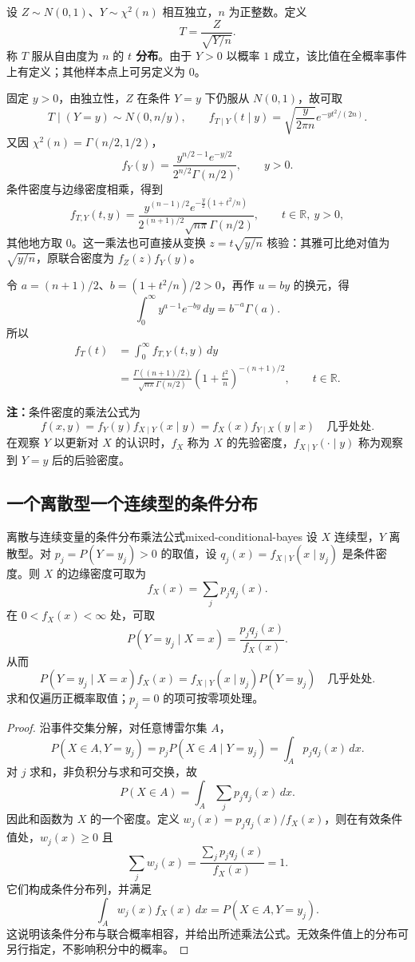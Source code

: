\begin{example}[$t$ 分布的密度]
设 $Z\sim N(0,1)$、$Y\sim\chi^2(n)$ 相互独立，$n$ 为正整数。定义
\[
T=\frac{Z}{\sqrt{Y/n}}.
\]
称 $T$ 服从自由度为 $n$ 的 \textbf{$t$ 分布}。由于 $Y>0$ 以概率 $1$ 成立，该比值在全概率事件上有定义；其他样本点上可另定义为 $0$。

固定 $y>0$，由独立性，$Z$ 在条件 $Y=y$ 下仍服从 $N(0,1)$，故可取
\[
T\mid(Y=y)\sim N(0,n/y),\qquad
f_{T\mid Y}(t\mid y)=\sqrt{\frac{y}{2\pi n}}e^{-yt^2/(2n)}.
\]
又因 $\chi^2(n)=\Gamma(n/2,1/2)$，
\[
f_Y(y)=\frac{y^{n/2-1}e^{-y/2}}{2^{n/2}\Gamma(n/2)},\qquad y>0.
\]
条件密度与边缘密度相乘，得到
\[
f_{T,Y}(t,y)=
\frac{y^{(n-1)/2}e^{-\frac y2(1+t^2/n)}}
 {2^{(n+1)/2}\sqrt{n\pi}\Gamma(n/2)},
\qquad t\in\mathbb R,\ y>0,
\]
其他地方取 $0$。这一乘法也可直接从变换 $z=t\sqrt{y/n}$ 核验：其雅可比绝对值为 $\sqrt{y/n}$，原联合密度为 $f_Z(z)f_Y(y)$。

令 $a=(n+1)/2$、$b=(1+t^2/n)/2>0$，再作 $u=by$ 的换元，得
\[
\int_0^\infty y^{a-1}e^{-by}\,dy=b^{-a}\Gamma(a).
\]
所以
\begin{align*}
f_T(t)
&=\int_0^\infty f_{T,Y}(t,y)\,dy\\
&=\frac{\Gamma((n+1)/2)}{\sqrt{n\pi}\Gamma(n/2)}
 \left(1+\frac{t^2}n\right)^{-(n+1)/2},
\qquad t\in\mathbb R.
\end{align*}
\end{example}

\textbf{注：}\quad 条件密度的乘法公式为
\[
f(x,y)=f_Y(y)f_{X\mid Y}(x\mid y)
      =f_X(x)f_{Y\mid X}(y\mid x)
\quad\text{几乎处处}.
\]
在观察 $Y$ 以更新对 $X$ 的认识时，$f_X$ 称为 $X$ 的先验密度，$f_{X\mid Y}(\cdot\mid y)$ 称为观察到 $Y=y$ 后的后验密度。

\subsection*{一个离散型一个连续型的条件分布}

\begin{proposition}{离散与连续变量的条件分布乘法公式}{mixed-conditional-bayes}
设 $X$ 连续型，$Y$ 离散型。对 $p_j=P(Y=y_j)>0$ 的取值，设 $q_j(x)=f_{X\mid Y}(x\mid y_j)$ 是条件密度。则 $X$ 的边缘密度可取为
\[
f_X(x)=\sum_jp_jq_j(x).
\]
在 $0<f_X(x)<\infty$ 处，可取
\[
P(Y=y_j\mid X=x)=\frac{p_jq_j(x)}{f_X(x)}.
\]
从而
\[
P(Y=y_j\mid X=x)f_X(x)
=f_{X\mid Y}(x\mid y_j)P(Y=y_j)
\quad\text{几乎处处}.
\]
求和仅遍历正概率取值；$p_j=0$ 的项可按零项处理。
\end{proposition}
\begin{proof}
沿事件交集分解，对任意博雷尔集 $A$，
\[
P(X\in A,Y=y_j)=p_jP(X\in A\mid Y=y_j)
=\int_Ap_jq_j(x)\,dx.
\]
对 $j$ 求和，非负积分与求和可交换，故
\[
P(X\in A)=\int_A\sum_jp_jq_j(x)\,dx.
\]
因此和函数为 $X$ 的一个密度。定义
$w_j(x)=p_jq_j(x)/f_X(x)$，则在有效条件值处，$w_j(x)\geq0$ 且
\[
\sum_jw_j(x)=\frac{\sum_jp_jq_j(x)}{f_X(x)}=1.
\]
它们构成条件分布列，并满足
\[
\int_Aw_j(x)f_X(x)\,dx=P(X\in A,Y=y_j).
\]
这说明该条件分布与联合概率相容，并给出所述乘法公式。无效条件值上的分布可另行指定，不影响积分中的概率。
\end{proof}


